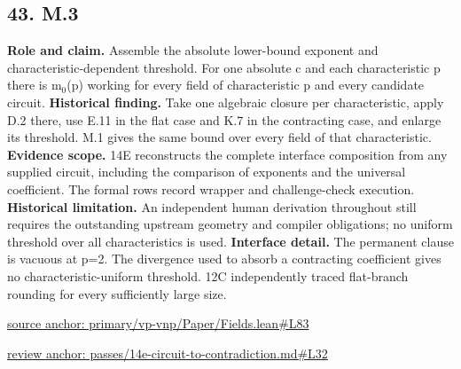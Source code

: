 \documentclass[11pt,letterpaper]{article}
\theoremstyle{definition}\newtheorem{definition}[theorem]{Definition}\newtheorem{example}[theorem]{Example}
\theoremstyle{remark}\newtheorem{remark}[theorem]{Remark}
\begin{document}
\subsection*{43. M.3}
\textbf{Role and claim.} Assemble the absolute lower-bound exponent and characteristic-dependent threshold. For one absolute c and each characteristic p there is m\ensuremath{{}_0}(p) working for every field of characteristic p and every candidate circuit.
\textbf{Historical finding.} Take one algebraic closure per characteristic, apply D.2 there, use E.11 in the flat case and K.7 in the contracting case, and enlarge its threshold. M.1 gives the same bound over every field of that characteristic.
\textbf{Evidence scope.} 14E reconstructs the complete interface composition from any supplied circuit, including the comparison of exponents and the universal coefficient. The formal rows record wrapper and challenge-check execution.
\textbf{Historical limitation.} An independent human derivation throughout still requires the outstanding upstream geometry and compiler obligations; no uniform threshold over all characteristics is used.
\textbf{Interface detail.} The permanent clause is vacuous at p=2. The divergence used to absorb a contracting coefficient gives no characteristic-uniform threshold. 12C independently traced flat-branch rounding for every sufficiently large size.
\par\href{https://github.com/nousentllc/VP-VNP-Review/blob/8a7976933b6b2b4ffda1ad3a0dfb5fc6b6f023e8/primary/vp-vnp/Paper/Fields.lean\#L83}{source anchor: primary/vp-vnp/Paper/Fields.lean\#L83}
\par\href{https://github.com/nousentllc/VP-VNP-Review/blob/8a7976933b6b2b4ffda1ad3a0dfb5fc6b6f023e8/passes/14e-circuit-to-contradiction.md\#L32}{review anchor: passes/14e-circuit-to-contradiction.md\#L32}
\goodbreak
{}
\hypertarget{claim.44}{}
\end{document}
